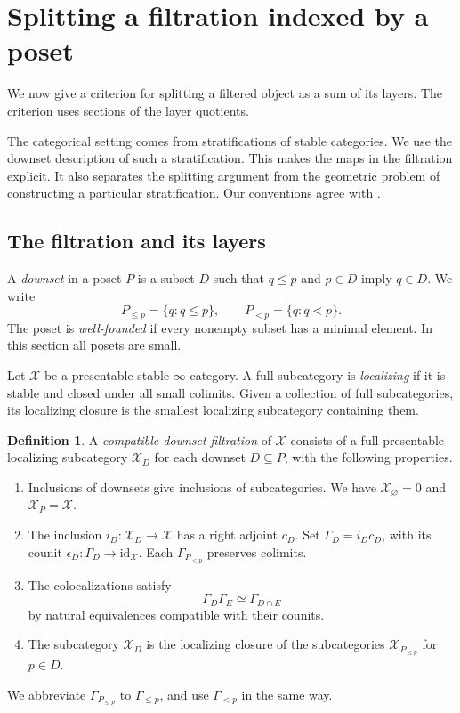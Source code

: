 \documentclass[11pt,reqno]{amsart}
\theoremstyle{definition}
\newtheorem{definition}[theorem]{Definition}
\theoremstyle{remark}
\theoremstyle{plain}
\numberwithin{equation}{section}
\begin{document}
\section{Splitting a filtration indexed by a poset}
\label{sec:splitting}

We now give a criterion for splitting a filtered object as a sum of its
layers. The criterion uses sections of the layer quotients.

The categorical setting comes from stratifications of stable categories.
We use the downset description of such a stratification. This makes the
maps in the filtration explicit. It also separates the splitting argument
from the geometric problem of constructing a particular stratification.
Our conventions agree with \cite[Definitions 2.4.1 and 2.4.3]{AMGR}.

\subsection{The filtration and its layers}

A \emph{downset} in a poset \(P\) is a subset \(D\) such that
\(q\leq p\) and \(p\in D\) imply \(q\in D\).
We write
\[
 P_{\leq p}=\{q:q\leq p\},
 \qquad
 P_{<p}=\{q:q<p\}.
\]
The poset is \emph{well-founded} if every nonempty subset has a minimal
element. In this section all posets are small.

Let \(\mathcal X\) be a presentable stable \(\infty\)-category.
A full subcategory is \emph{localizing} if it is stable and closed under
all small colimits. Given a collection of full subcategories, its
localizing closure is the smallest localizing subcategory containing
them.

\begin{definition}
\label{def:downset-filtration}
A \emph{compatible downset filtration} of \(\mathcal X\) consists of a
full presentable localizing subcategory \(\mathcal X_D\) for each downset
\(D\subseteq P\), with the following properties.
\begin{enumerate}
 \item Inclusions of downsets give inclusions of subcategories.
 We have \(\mathcal X_\varnothing=0\) and \(\mathcal X_P=\mathcal X\).
 \item The inclusion \(i_D:\mathcal X_D\to\mathcal X\) has a right
 adjoint \(c_D\). Set \(\Gamma_D=i_Dc_D\), with its counit
 \(\epsilon_D:\Gamma_D\to\mathrm{id}_{\mathcal X}\).
 Each \(\Gamma_{P_{\leq p}}\) preserves colimits.
 \item The colocalizations satisfy
 \[
  \Gamma_D\Gamma_E\simeq\Gamma_{D\cap E}
 \]
 by natural equivalences compatible with their counits.
 \item The subcategory \(\mathcal X_D\) is the localizing closure of
 the subcategories \(\mathcal X_{P_{\leq p}}\) for \(p\in D\).
\end{enumerate}
We abbreviate \(\Gamma_{P_{\leq p}}\) to \(\Gamma_{\leq p}\), and use
\(\Gamma_{<p}\) in the same way.
\end{definition}
\end{document}
